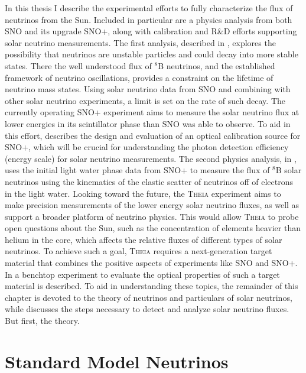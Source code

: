 In this thesis I describe the experimental efforts to fully characterize the flux of neutrinos from the Sun.
Included in particular are a physics analysis from both SNO and its upgrade SNO+, along with calibration and R\&D efforts supporting solar neutrino measurements.
The first analysis, described in , explores the possibility that neutrinos are unstable particles and could decay into more stable states.
There the well understood flux of $^8$B neutrinos, and the established framework of neutrino oscillations, provides a constraint on the lifetime of neutrino mass states.
Using solar neutrino data from SNO and combining with other solar neutrino experiments, a limit is set on the rate of such decay.
The currently operating SNO+ experiment aims to measure the solar neutrino flux at lower energies in its scintillator phase than SNO was able to observe.
To aid in this effort,  describes the design and evaluation of an optical calibration source for SNO+, which will be crucial for understanding the photon detection efficiency (energy scale) for solar neutrino measurements.
The second physics analysis, in , uses the initial light water phase data from SNO+ to measure the flux of $^8$B solar neutrinos using the kinematics of the elastic scatter of neutrinos off of electrons in the light water.
Looking toward the future, the \textsc{Theia} \cite{asdc} experiment aims to make precision measurements of the lower energy solar neutrino fluxes, as well as support a broader platform of neutrino physics.
This would allow \textsc{Theia} to probe open questions about the Sun, such as the concentration of elements heavier than helium in the core, which affects the relative fluxes of different types of solar neutrinos. 
To achieve such a goal, \textsc{Theia} requires a next-generation target material that combines the positive aspects of experiments like SNO and SNO+. 
In  a benchtop experiment to evaluate the optical properties of such a target material is described.
To aid in understanding these topics, the remainder of this chapter is devoted to the theory of neutrinos and particulars of solar neutrinos, while  discusses the steps necessary to detect and analyze solar neutrino fluxes.
But first, the theory.

\section{Standard Model Neutrinos}
\label{sec:stdmodel}

